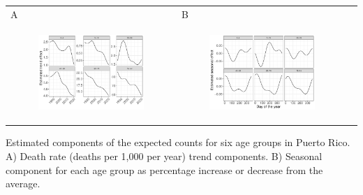 \documentclass[11pt]{article}
\begin{document}
\begin{suppfigure}[ht]
	\begin{tabular}{lll}
	A&B\\
	\begin{subfigure}[t]{0.49\linewidth}
		\centering
		\includegraphics[width=1\linewidth]{figs/supp-figure-1a.pdf} 
	\end{subfigure}&
	\begin{subfigure}[t]{0.49\linewidth}
		\centering
		\includegraphics[width=1\linewidth]{figs/supp-figure-1b.pdf}
	\end{subfigure}&\\
    \end{tabular}
    \caption{Estimated components of the expected counts for six age groups in Puerto Rico. A) Death rate (deaths per 1,000 per year) trend components. B) Seasonal component for each age group as percentage increase or decrease from the average.}
    \label{supp-fig:model-components}
\end{suppfigure}
\end{document}
